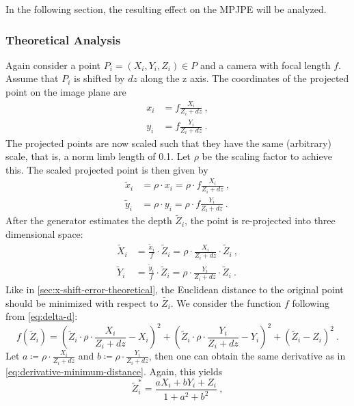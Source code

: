 In the following section, the resulting effect on the MPJPE will be analyzed.

\subsubsection{Theoretical Analysis}
Again consider a point $P_i=(X_i, Y_i, Z_i) \in P$ and a camera with focal length $f$. Assume that $P_i$ is shifted by $dz$ along the z axis.
The coordinates of the projected point on the image plane are
\begin{align}
	x_i &= f \frac{X_i}{Z_i + dz} \ , \\
	y_i &= f \frac{Y_i}{Z_i + dz} \ .
\end{align}
The projected points are now scaled such that they have the same (arbitrary) scale, that is, a norm limb length of 0.1.
Let $\rho$ be the scaling factor to achieve this.
The scaled projected point is then given by
\begin{align}
		\widetilde{x}_i &= \rho \cdot x_i 
		= \rho \cdot f \frac{X_i}{Z_i + dz} \ , \\
		\widetilde{y}_i &= \rho \cdot y_i
		= \rho \cdot f \frac{Y_i}{Z_i + dz} \ .
\end{align}
After the generator estimates the depth $\widetilde{Z}_i$, the point is re-projected into three dimensional space:
\begin{align}
	\widetilde{X}_i &= \frac{\widetilde{x}_i}{f} \cdot \widetilde{Z}_i
	= \rho \cdot \frac{X_i}{Z_i + dz} \cdot \widetilde{Z}_i \ , \\
	\widetilde{Y}_i &= \frac{\widetilde{y}_i}{f} \cdot \widetilde{Z}_i
	= \rho \cdot \frac{Y_i}{Z_i + dz}\cdot \widetilde{Z}_i \ .
\end{align}
Like in \autoref{sec:x-shift-error-theoretical}, the Euclidean distance to the original point should be minimized with respect to $\widetilde{Z_i}$.
We consider the function $f$ following from \autoref{eq:delta-d}:
\begin{equation}
	f(\widetilde{Z}_i) = \left ( \widetilde{Z}_i \cdot \rho  \cdot \frac{X_i}{Z_i + dz}- X_i \right)^2 + \left ( \widetilde{Z}_i \cdot \rho \cdot \frac{Y_i}{Z_i + dz} - Y_i \right)^2
					 + \left ( \widetilde{Z}_i - Z_i \right)^2 \ .
\end{equation}
Let $a \coloneqq \rho \cdot \frac{X_i}{Z_i + dz}$ and $b \coloneqq \rho \cdot \frac{Y_i}{Z_i + dz}$, then one can obtain the same derivative as in \autoref{eq:derivative-minimum-distance}.
Again, this yields
\begin{equation}
	\widetilde{Z}_i^\ast = \frac{a X_i + b Y_i + Z_i}{1 + a^2 + b^2} \ ,
\end{equation}
